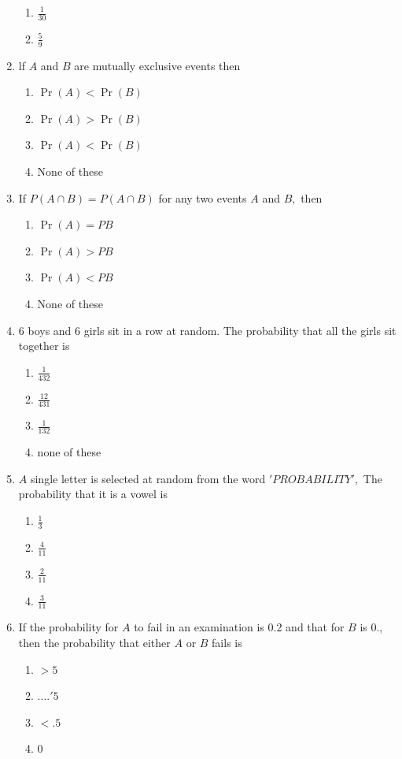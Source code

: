\documentclass[12pt]{article}
\providecommand{\pr}[1]{\ensuremath{\Pr\left(#1\right)}}
\begin{document}
\begin{enumerate}
\begin{enumerate}
\item $\frac{1}{30}$
\item $\frac{5}{9}$
	\end{enumerate}
\item lf $A$ and $B$ are mutually exclusive events then
	\begin{enumerate}
\item $\pr{A}<\pr{B}$
\item $\pr{A}>\pr{B}$
\item $\pr{A}<\pr{B}$
\item None of these
	\end{enumerate}
\item If $P(A\cap B)=P(A\cap B)$ for any two events $A$ and $B,$ then
	\begin{enumerate}
\item $\pr{A}=P{B}$
\item $\pr{A}>P{B}$
\item $\pr{A}<P{B}$
\item None of these
	\end{enumerate}
\item 6 boys and 6 girls sit in a row at random. The probability that all the girls sit together is
	\begin{enumerate}
\item $\frac{1}{432}$
\item $\frac{12}{431}$
\item $\frac{1}{132}$
\item none of these
	\end{enumerate}
\item $A$ single letter is selected at random from the word $'PROBABILITY',$ The probability that it is a vowel is
	\begin{enumerate}
\item $\frac{1}{3}$
\item $\frac{4}{11}$
\item $\frac{2}{11}$
\item $\frac{3}{11}$
	\end{enumerate}
\item If the probability for $A$ to fail in an examination is 0.2 and that for $B$ is 0., then the probability that either $A$ or $B$ fails is
	\begin{enumerate}
\item $>5$ 
\item $....\prime 5$
\item $<.5$
\item 0
	\end{enumerate}

\end{enumerate}
\end{document}
